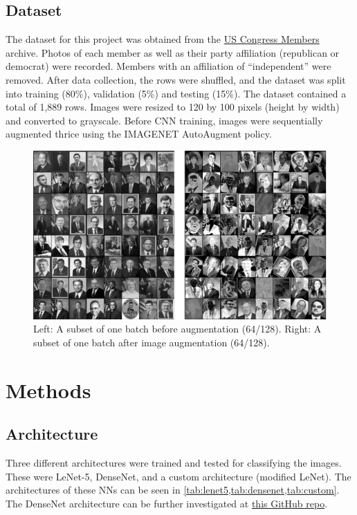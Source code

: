 \documentclass[manuscript,screen,review]{acmart}
\begin{document}
\subsection{Dataset}

The dataset for this project was obtained from the \href{https://www.congress.gov/members}{US Congress Members} archive. Photos of each member as well as their party affiliation (republican or democrat) were recorded. Members with an affiliation of ``independent'' were removed. After data collection, the rows were shuffled, and the dataset was split into training (80\%), validation (5\%) and testing (15\%). The dataset contained a total of 1,889 rows. Images were resized to 120 by 100 pixels (height by width) and converted to grayscale. Before CNN training, images were sequentially augmented thrice using the IMAGENET AutoAugment policy. 

\begin{figure}[h]
  \centering
  \includegraphics[width=\linewidth]{../presentation/batch_both.png}
  \caption{Left: A subset of one batch before augmentation (64/128). Right: A subset of one batch after image augmentation (64/128).}
  \label{fig:batch}
\end{figure}

\section{Methods}

\subsection{Architecture}

Three different architectures were trained and tested for classifying the images. These were LeNet-5, DenseNet, and a custom architecture (modified LeNet). The architectures of these NNs can be seen in \cref{tab:lenet5,tab:densenet,tab:custom}. The DenseNet architecture can be further investigated at \href{https://github.com/andreasveit/densenet-pytorch}{this GitHub repo}. 
\end{document}
